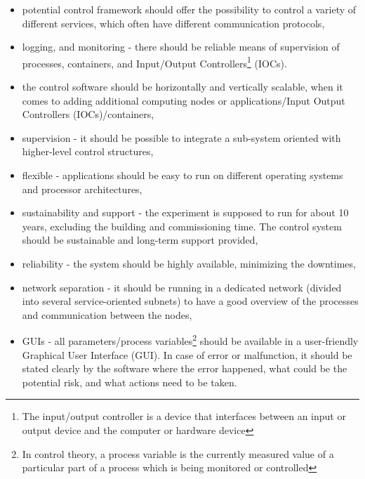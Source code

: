  
 \begin{itemize}
    \item potential control framework should offer the possibility to control a variety of different services, which often have different communication protocols,
    \item logging, and monitoring - there should be reliable means of supervision of processes, containers, and Input/Output Controllers\footnote{The input/output controller is a device that interfaces between an input or output device and the computer or hardware device} (\glspl{IOC}).
    \item the control software should be horizontally and vertically scalable, when it comes to adding additional computing nodes or applications/Input Output Controllers (\glspl{IOC})/containers,
    \item supervision - it should be possible to integrate a sub-system oriented with higher-level control structures,
     \item flexible - applications should be easy to run on different operating systems and processor architectures,
     \item sustainability and support - the experiment is supposed to run for about 10 years, excluding the building and commissioning time. The control system should be sustainable and long-term support provided,
     \item reliability - the system should be highly available, minimizing the downtimes,
     \item network separation - it should be running in a dedicated network (divided into several service-oriented subnets) to have a good overview of the processes and communication between the nodes,
     \item \glspl{GUI} - all parameters/process variables\footnote{In control theory, a process variable is the currently measured value of a particular part of a process which is being monitored or controlled} should be available in a user-friendly Graphical User Interface (\gls{GUI}). In case of error or malfunction, it should be stated clearly by the software where the error happened, what could be the potential risk, and what actions need to be taken.

 \end{itemize}
\newpage

